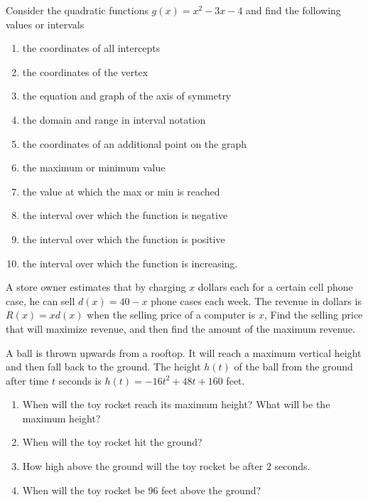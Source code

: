 \documentclass[
  en,11pt]{elegantbook}
\let\BeginKnitrBlock\begin \let\EndKnitrBlock\end
\begin{document}
\BeginKnitrBlock{exercise}
\protect\hypertarget{exr:unnamed-chunk-270}{}{\label{exr:unnamed-chunk-270} }
Consider the quadratic functions \(g(x)=x^2-3x-4\) and find the following values or intervals

\begin{enumerate}
\def\labelenumi{\arabic{enumi}.}

\item
  the coordinates of all intercepts
\item
  the coordinates of the vertex
\item
  the equation and graph of the axis of symmetry
\item
  the domain and range in interval notation
\item
  the coordinates of an additional point on the graph
\item
  the maximum or minimum value
\item
  the value at which the max or min is reached
\item
  the interval over which the function is negative
\item
  the interval over which the function is positive
\item
  the interval over which the function is increasing.
\end{enumerate}
\EndKnitrBlock{exercise}

\BeginKnitrBlock{exercise}
\protect\hypertarget{exr:unnamed-chunk-271}{}{\label{exr:unnamed-chunk-271} }
A store owner estimates that by charging \(x\) dollars each for a certain cell phone case, he can sell \(d(x)=40 - x\) phone cases each week. The revenue in dollars is \(R(x)=xd(x)\) when the selling price of a computer is \(x\), Find the selling price that will maximize revenue, and then find the amount of the maximum revenue.
\EndKnitrBlock{exercise}

\BeginKnitrBlock{exercise}
\protect\hypertarget{exr:unnamed-chunk-272}{}{\label{exr:unnamed-chunk-272} }
A ball is thrown upwards from a rooftop. It will reach a maximum vertical height and then fall back to the ground. The height \(h(t)\) of the ball from the ground after time \(t\) seconds is \(h(t)=-16t^2 + 48t + 160\) feet.

\begin{enumerate}
\def\labelenumi{\arabic{enumi}.}

\item
  When will the toy rocket reach its maximum height? What will be the maximum height?
\item
  When will the toy rocket hit the ground?
\item
  How high above the ground will the toy rocket be after 2 seconds.
\item
  When will the toy rocket be 96 feet above the ground?
\end{enumerate}
\EndKnitrBlock{exercise}
\end{document}
